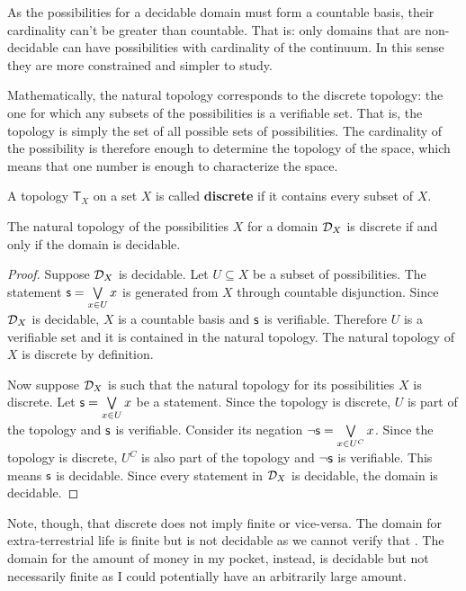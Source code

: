 \documentclass[11pt,letterpaper,fleqn]{memoir} %
\begin{document}
As the possibilities for a decidable domain must form a countable basis, their cardinality can't be greater than countable. That is: only domains that are non-decidable can have possibilities with cardinality of the continuum. In this sense they are more constrained and simpler to study.

Mathematically, the natural topology corresponds to the discrete topology: the one for which any subsets of the possibilities is a verifiable set. That is, the topology is simply the set of all possible sets of possibilities. The cardinality of the possibility is therefore enough to determine the topology of the space, which means that one number is enough to characterize the space.

\begin{mathSection}
\begin{defn}
	A topology $\mathsf{T}_X$ on a set $X$ is called \textbf{discrete} if it contains every subset of $X$.
\end{defn}

\begin{thrm}\label{thrm_decidablity_is_discreteness}
	The natural topology of the possibilities $X$ for a domain $\mathcal{D}_X$ is discrete if and only if the domain is decidable.
\end{thrm}
\begin{proof}
	Suppose $\mathcal{D}_X$ is decidable. Let $U \subseteq X$ be a subset of possibilities. The statement $\mathsf{s} = \bigvee\limits_{x \in U} x$ is generated from $X$ through countable disjunction. Since $\mathcal{D}_X$ is decidable, $X$ is a countable basis and $\mathsf{s}$ is verifiable. Therefore $U$ is a verifiable set and it is contained in the natural topology. The natural topology of $X$ is discrete by definition.
	
	Now suppose $\mathcal{D}_X$ is such that the natural topology for its possibilities $X$ is discrete. Let $\mathsf{s} = \bigvee\limits_{x \in U} x$ be a statement. Since the topology is discrete, $U$ is part of the topology and $\mathsf{s}$ is verifiable. Consider its negation $\neg\mathsf{s} = \bigvee\limits_{x \in U^C} x$. Since the topology is discrete, $U^C$ is also part of the topology and $\neg\mathsf{s}$ is verifiable. This means $\mathsf{s}$ is decidable. Since every statement in $\mathcal{D}_X$ is decidable, the domain is decidable.
\end{proof}
	
\end{mathSection}

Note, though, that discrete does not imply finite or vice-versa. The domain for extra-terrestrial life is finite but is not decidable as we cannot verify that . The domain for the amount of money in my pocket, instead, is decidable but not necessarily finite as I could potentially have an arbitrarily large amount.
\end{document}
